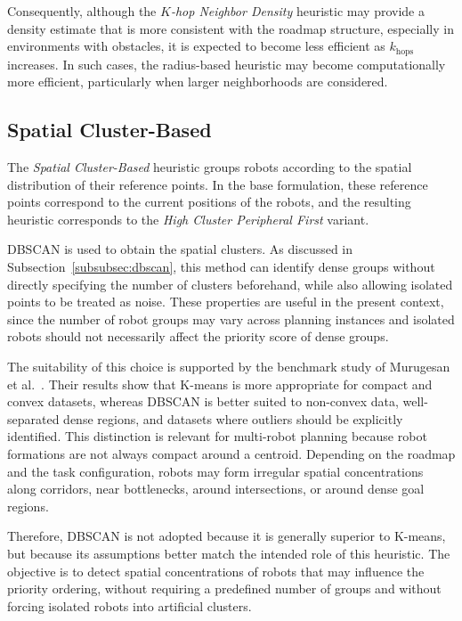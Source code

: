 Consequently, although the \textit{\(K\)-hop Neighbor Density} heuristic may provide a density estimate that is more consistent with the roadmap structure, especially in environments with obstacles, it is expected to become less efficient as \(k_{\text{hops}}\) increases. In such cases, the radius-based heuristic may become computationally more efficient, particularly when larger neighborhoods are considered.

\subsection{Spatial Cluster-Based}
\label{subsec:spatial_cluster_based}
\hspace{\parindent}
The \textit{Spatial Cluster-Based} heuristic groups robots according to the spatial distribution of their reference points. In the base formulation, these reference points correspond to the current positions of the robots, and the resulting heuristic corresponds to the \textit{High Cluster Peripheral First} variant.

DBSCAN is used to obtain the spatial clusters. As discussed in Subsection~\ref{subsubsec:dbscan}, this method can identify dense groups without directly specifying the number of clusters beforehand, while also allowing isolated points to be treated as noise. These properties are useful in the present context, since the number of robot groups may vary across planning instances and isolated robots should not necessarily affect the priority score of dense groups.

The suitability of this choice is supported by the benchmark study of Murugesan et al.~\cite{murugesan2021benchmarking}. Their results show that K-means is more appropriate for compact and convex datasets, whereas DBSCAN is better suited to non-convex data, well-separated dense regions, and datasets where outliers should be explicitly identified. This distinction is relevant for multi-robot planning because robot formations are not always compact around a centroid. Depending on the roadmap and the task configuration, robots may form irregular spatial concentrations along corridors, near bottlenecks, around intersections, or around dense goal regions.

Therefore, DBSCAN is not adopted because it is generally superior to K-means, but because its assumptions better match the intended role of this heuristic. The objective is to detect spatial concentrations of robots that may influence the priority ordering, without requiring a predefined number of groups and without forcing isolated robots into artificial clusters.

